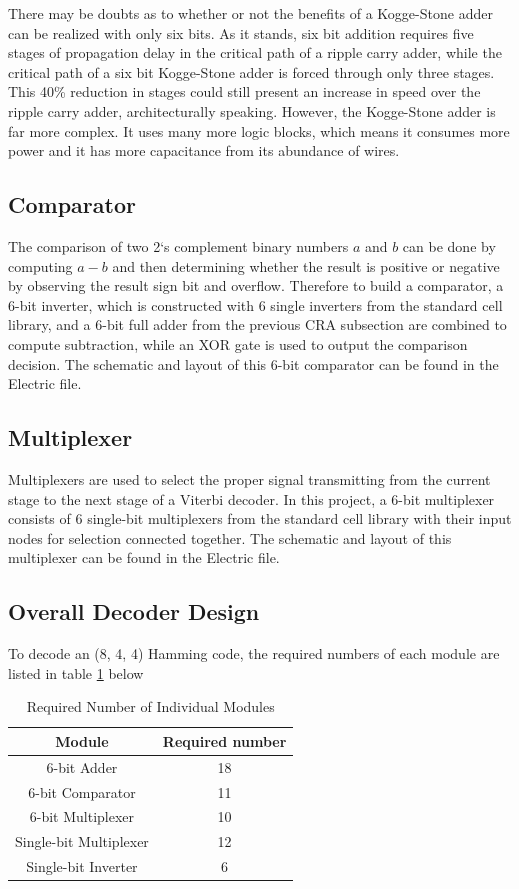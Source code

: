 \documentclass[conference]{IEEEtran}
\begin{document}
There may be doubts as to whether or not the benefits of a Kogge-Stone adder can be realized with only six bits. As it stands, six bit addition requires five stages of propagation delay in the critical path of a ripple carry adder, while the critical path of a six bit Kogge-Stone adder is forced through only three stages. This 40\% reduction in stages could still present an increase in speed over the ripple carry adder, architecturally speaking. However, the Kogge-Stone adder is far more complex. It uses many more logic blocks, which means it consumes more power and it has more capacitance from its abundance of wires.

\subsection{Comparator}
The comparison of two 2`s complement binary numbers $a$ and $b$ can be done by computing $a-b$ and then determining whether the result is positive or negative by observing the result sign bit and overflow. Therefore to build a comparator, a 6-bit inverter, which is constructed with 6 single inverters from the standard cell library, and a 6-bit full adder from the previous CRA subsection are combined to compute subtraction, while an XOR gate is used to output the comparison decision. The schematic and layout of this 6-bit comparator can be found in the Electric file.
\subsection{Multiplexer}
Multiplexers are used to select the proper signal transmitting from the current stage to the next stage of a Viterbi decoder. In this project, a 6-bit multiplexer consists of 6 single-bit multiplexers from the standard cell library with their input nodes for selection connected together. The schematic and layout of this multiplexer can be found in the Electric file.
\subsection{Overall Decoder Design}
To decode an (8, 4, 4) Hamming code, the required numbers of each module are listed in table \ref{table:decoder} below
\begin{table}[h]
\centering
\caption{Required Number of Individual Modules}
\label{table:decoder}
\begin{tabular}{|c|c|}
\hline
Module                 & Required number \\ \hline
6-bit Adder            & 18              \\ \hline
6-bit Comparator       & 11              \\ \hline
6-bit Multiplexer      & 10              \\ \hline
Single-bit Multiplexer & 12              \\ \hline
Single-bit Inverter    & 6               \\ \hline
\end{tabular}
\end{table}
\end{document}

